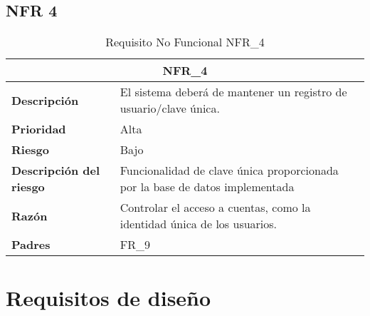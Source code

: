 \documentclass{scrreprt}
\begin{document}
\subsection{NFR 4}
    \begin{table}[H]
        \label{tab:my-table}
        \begin{tabular}{|p{5cm}|p{11cm}|}
        \hline
        \multicolumn{2}{|c|}{\textbf{NFR_4}} \\
        \hline
        \textbf{Descripción  }                      &  El sistema deberá de mantener un registro de usuario/clave única.                                                                    \\ \hline
        \textbf{Prioridad}                          & Alta                                                                                              \\ \hline
        \textbf{Riesgo}                          & Bajo                                                                                                \\ \hline
        \textbf{Descripción del riesgo}                    &  Funcionalidad de clave única proporcionada por la base de datos implementada                          \\ \hline
        \textbf{Razón}                   & Controlar el acceso a cuentas, como la identidad única de los usuarios.                                                                                         \\ \hline
        \textbf{Padres}                               &  FR_9\\  \hline
        \end{tabular}%
        
        \caption{Requisito No Funcional NFR_4}
\end{table}

\section{Requisitos de diseño}
\end{document}

